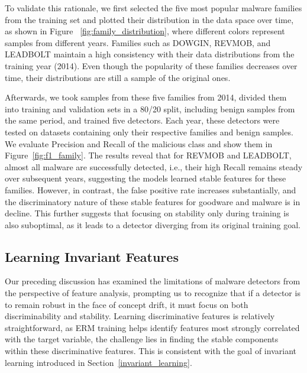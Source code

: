To validate this rationale, we first selected the five most popular malware families from the training set and plotted their distribution in the data space over time, as shown in Figure ~\ref{fig:family_distribution}, where different colors represent samples from different years. Families such as DOWGIN, REVMOB, and LEADBOLT maintain a high consistency with their data distributions from the training year (2014). Even though the popularity of these families decreases over time, their distributions are still a sample of the original ones.

Afterwards, we took samples from these five families from 2014, divided them into training and validation sets in a 80/20 split, including benign samples from the same period, and trained five detectors. Each year, these detectors were tested on datasets containing only their respective families and benign samples. We evaluate Precision and Recall of the malicious class and show them in Figure~\ref{fig:f1_family}. The results reveal that for REVMOB and LEADBOLT, almost all malware are successfully detected, i.e., their high Recall remains steady over subsequent years, suggesting the models learned stable features for these families. However, in contrast, the false positive rate increases substantially, and the discriminatory nature of these stable features for goodware and malware is in decline. This further suggests that focusing on stability only during training is also suboptimal, as it leads to a detector diverging from its original training goal.

\subsection{Learning Invariant Features}

Our preceding discussion has examined the limitations of malware detectors from the perspective of feature analysis, prompting us to recognize that if a detector is to remain robust in the face of concept drift, it must focus on both discriminability and stability. Learning discriminative features is relatively straightforward, as ERM training helps identify features most strongly correlated with the target variable, the challenge lies in finding the stable components within these discriminative features. This is consistent with the goal of invariant learning introduced in Section~\ref{invariant_learning}.

